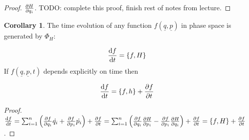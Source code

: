 \documentclass[12pt,a4paper]{article}
\theoremstyle{definition}
\newtheorem{corollary}[definition]{Corollary}
\begin{document}
\begin{proof}
	$\diffp{H}{q_i}$. TODO: complete this proof, finish rest of notes from lecture.
\end{proof}

\begin{corollary}
	The time evolution of any function $f(\underline{q}, \underline{p})$ in phase space is generated by $\Phi_H$:

	\[ \diff{f}{t} = \{ f, H \} \]
	If $f(\underline{q}, \underline{p}, t)$ depends explicitly on time then

	\[ \diff{f}{t} = \{ f, h \} + \diffp{f}{t} \]
\end{corollary}

\begin{proof}
	$\diff{f}{t} = \sum_{i = 1}^n \left( \diffp{f}{q_i} \dot{q_i} + \diffp{f}{p_i} \dot{p_i} \right) + \diffp{f}{t} = \sum_{i = 1}^n \left( \diffp{f}{q_i} \diffp{H}{p_i} - \diffp{f}{p_i} \diffp{H}{q_i} \right) + \diffp{f}{t} = \{ f, H \} + \diffp{f}{t}$.
\end{proof}
\end{document}
